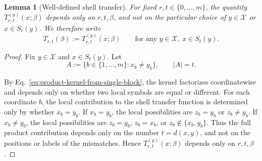 \documentclass[a4paper,onecolumn,11pt,unpublished]{quantumarticle}
\newtheorem{lemma}[theorem]{Lemma}
\theoremstyle{remark}
\begin{document}



\begin{lemma}[Well-defined shell transfer]
\label{lem:shell-transfer-well-defined}
For fixed \(r,t\in\{0,\dots,m\}\), the quantity
\(T_{r,t}^{(y)}(x;\beta)\) depends only on \(r,t,\beta\), and not on the
particular choice of \(y\in \mathcal X\) or \(x\in S_t(y)\). We therefore write
\[
T_{r,t}(\beta):=T_{r,t}^{(y)}(x;\beta)
\qquad
\text{for any }y\in \mathcal X,\ x\in S_t(y).
\]
\end{lemma}

\begin{proof}
Fix \(y\in \mathcal X\) and \(x\in S_t(y)\). Let
\[
A:=\{b\in\{1,\dots,m\}:x_b\neq y_b\},
\qquad |A|=t.
\]


By Eq.~\ref{eq:product-kernel-from-single-block}, the   kernel factorizes
coordinatewise and depends only on whether two local symbols are equal or
different. For each coordinate \(b\), the local contribution to the shell
transfer function is determined only by whether \(x_b=y_b\). If
\(x_b=y_b\), the local possibilities are \(z_b=y_b\) or \(z_b\neq y_b\). If
\(x_b\neq y_b\), the local possibilities are \(z_b=y_b\), \(z_b=x_b\), or
\(z_b\notin\{x_b,y_b\}\). Thus the full product contribution depends only on
the number \(t=d(x,y)\), and not on the positions or labels of the mismatches.
Hence \(T_{r,t}^{(y)}(x;\beta)\) depends only on \(r,t,\beta\).
\end{proof}
\end{document}
